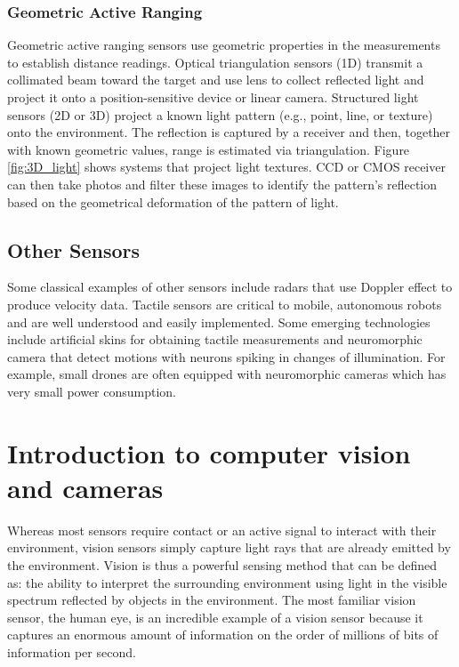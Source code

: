 \subsubsection{Geometric Active Ranging}
Geometric active ranging sensors use geometric properties in the measurements to establish distance readings. Optical triangulation sensors (1D) transmit a collimated beam toward the target and use lens to collect reflected light and project it onto a position-sensitive device or linear camera. Structured light sensors (2D or 3D) project a known light pattern (e.g., point, line, or texture) onto the environment. The reflection is captured by a receiver and then, together with known geometric values, range is estimated via triangulation. Figure \ref{fig:3D_light} shows systems that project light textures. CCD or CMOS receiver can then take photos and filter these images to identify the pattern’s reflection based on the geometrical deformation of the pattern of light.
\subsection{Other Sensors}

Some classical examples of other sensors include radars that use Doppler effect to produce velocity data. Tactile sensors are critical to mobile, autonomous robots and are well understood and easily implemented. Some emerging technologies include artificial skins for obtaining tactile measurements and neuromorphic camera that detect motions with neurons spiking in changes of illumination. For example, small drones are often equipped with neuromorphic cameras which has very small power consumption.


\section{Introduction to computer vision and cameras}
Whereas most sensors require contact or an active signal to interact with their environment, vision sensors simply capture light rays that are already emitted by the environment. Vision is thus a powerful sensing method that can be defined as: the ability to interpret the surrounding environment using light in the visible spectrum reflected by objects in the environment. The most familiar vision sensor, the human eye, is an incredible example of a vision sensor because it captures an enormous amount of information on the order of millions of bits of information per second.

